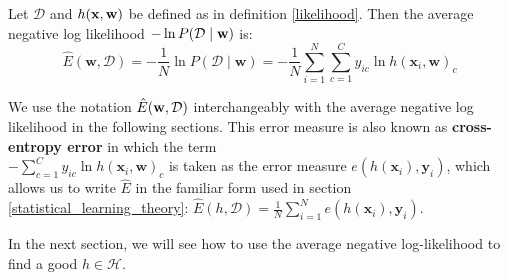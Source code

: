 \begin{definition}
	\label{negative_log-likelihood}
	Let $\mathcal{D}$ and $h(\mathbf{x}, \mathbf{w})$ be defined as in definition \ref{likelihood}. Then the average negative log likelihood $-\ln P(\mathcal{D} \mid \mathbf{w})$ is:
	$$
	\hat{E}(\mathbf{w}, \mathcal{D}) = - \frac{1}{N}\ln P(\mathcal{D} \mid \mathbf{w}) = - \frac{1}{N}\sum\limits_{i=1}^N\sum\limits_{c=1}^C y_{ic} \ln h(\mathbf{x}_i, \mathbf{w})_c
	$$
\end{definition}
\noindent
We use the notation $\hat{E}(\mathbf{w}, \mathcal{D})$ interchangeably with the average negative log likelihood in the following sections. This error measure is also known as \textbf{cross-entropy error} in which the term \\$-\sum_{c=1}^C y_{ic} \ln h(\mathbf{x}_i, \mathbf{w})_c$ is taken as the error measure $e(h(\mathbf{x}_i), \mathbf{y}_i)$, which allows us to write $\hat{E}$ in the familiar form used in section \ref{statistical_learning_theory}: $\hat{E}(h, \mathcal{D}) = \frac{1}{N}\sum_{i=1}^N e(h(\mathbf{x}_i), \mathbf{y}_i)$.

In the next section, we will see how to use the average negative log-likelihood to find a good $h \in \mathcal{H}$.
